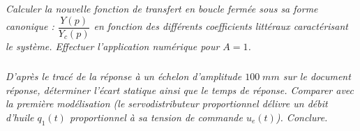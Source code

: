 \documentclass[10pt,oneside]{article}
\begin{document}
\subparagraph{}
\textit{Calculer la nouvelle fonction de transfert en boucle fermée sous sa forme canonique : $\dfrac{Y(p)}{Y_c (p)}$ en fonction des différents coefficients littéraux caractérisant le système. Effectuer l’application numérique pour $A=1$.}


\subparagraph{}
\textit{D’après le tracé de la réponse à un échelon d’amplitude $100\;mm$ sur le document réponse, déterminer l’écart statique ainsi que le temps de réponse. Comparer avec la première modélisation (le servodistributeur proportionnel délivre un débit d’huile $q_1(t)$ proportionnel à sa tension de commande $u_e(t)$). Conclure.}
\end{document}
